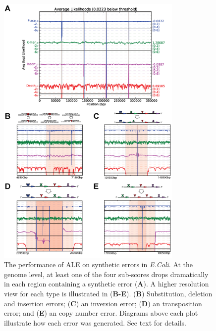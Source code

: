 \documentclass[phd,tocprelim]{cornell}
\begin{document}
\begin{figure}[!tpb]%
    \centerline{\includegraphics[width=0.8\textwidth]{figures/ALE/Clark_Fig2b.png}}
    \caption[ALE performance on with synthetic reads]{The performance of ALE on synthetic errors in {\it E.Coli}. At the genome level, at least one of the four sub-scores drops dramatically in each region containing a synthetic error ({\bf A}). A higher resolution view for each type is illustrated in ({\bf B-E}). ({\bf B}) Substitution, deletion and insertion errors; ({\bf C}) an inversion error; ({\bf D}) an transposition error; and ({\bf E}) an copy number error. Diagrams above each plot illustrate how each error was generated. See text for details.}\label{ALEfig2}
\end{figure}
\end{document}
